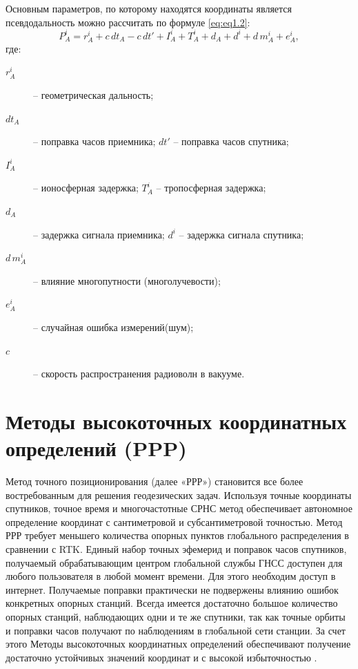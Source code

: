 Основным параметров, по которому находятся координаты является псевдодальность можно рассчитать по формуле \cref{eq:eq1.2}:
\begin{equation}
	\label{eq:eq1.2}
	P^i_A=r^i_A+c\,dt_A-c\,dt'+I^i_A+T^i_A+d_A+d^i+d\,m^i_A+e^i_A,
\end{equation}
где: 
\begin{description}
	\item[$r^i_A$] -- геометрическая дальность; 
	\item[$dt_A$] -- поправка часов приемника;  $dt'$ -- поправка часов спутника;
	\item[$I^i_A$] -- ионосферная задержка;  $T^i_A$ -- тропосферная задержка;
	\item[$d_A$] -- задержка сигнала приемника;  $d^i$ -- задержка сигнала спутника;
	\item[$d\,m^i_A$] -- влияние многопутности (многолучевости); 
	\item[$e^i_A$] -- случайная ошибка измерений(шум);
	\item[$c$] -- скорость распространения радиоволн в вакууме.
\end{description}



\section{Методы высокоточных координатных определений (PPP) }\label{sec:ch1/sec2}

Метод точного позиционирования (далее «РРР») становится все более востребованным для решения геодезических задач. Используя точные координаты спутников, точное время и многочастотные СРНС метод обеспечивает автономное определение координат с сантиметровой и субсантиметровой точностью. Метод РРР требует меньшего количества опорных пунктов глобального распределения в сравнении с RTK. Единый набор точных эфемерид и поправок часов спутников, получаемый обрабатывающим центром глобальной службы ГНСС доступен для любого пользователя в любой момент времени. Для этого необходим доступ в интернет. Получаемые поправки практически не подвержены влиянию ошибок конкретных опорных станций. Всегда имеется достаточно большое количество опорных станций, наблюдающих одни и те же спутники, так как точные орбиты и поправки часов получают по наблюдениям в глобальной сети станции. За счет этого Методы высокоточных координатных определений обеспечивают получение достаточно устойчивых значений координат и с высокой избыточностью \cite{src74,src75,src76,src77}. 

